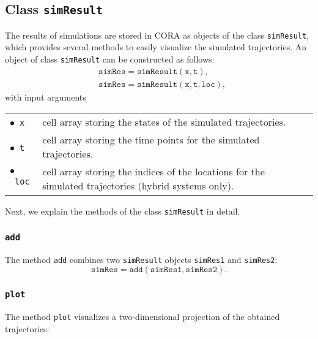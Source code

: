 \subsection{Class \texttt{simResult}}
\label{sec:simResult}

The results of simulations are stored in CORA as objects of the class \texttt{simResult}, which provides several methods to easily visualize the simulated trajectories. An object of class \texttt{simResult} can be constructed as follows:
\begin{equation*}
	\begin{split}
		& \texttt{simRes} = \texttt{simResult}(\texttt{x},\texttt{t}), \\
		& \texttt{simRes} = \texttt{simResult}(\texttt{x},\texttt{t},\texttt{loc}),
	\end{split}
\end{equation*}
with input arguments
\begin{center}
\renewcommand{\arraystretch}{1.3}
\begin{tabular}[t]{l p{13cm} }
	$\bullet$~\texttt{x} & cell array storing the states of the simulated trajectories.\\
	$\bullet$~\texttt{t} & cell array storing the time points for the simulated trajectories. \\
	$\bullet$~\texttt{loc} & cell array storing the indices of the locations for the simulated trajectories (hybrid systems only).
\end{tabular}
\end{center}

Next, we explain the methods of the class \texttt{simResult} in detail.

\subsubsection{\texttt{add}}

The method \texttt{add} combines two \texttt{simResult} objects \texttt{simRes1} and \texttt{simRes2}:
\begin{equation*}
	\texttt{simRes} = \texttt{add}(\texttt{simRes1},\texttt{simRes2}).
\end{equation*}


\subsubsection{\texttt{plot}}

The method \texttt{plot} visualizes a two-dimensional projection of the obtained trajectories:

